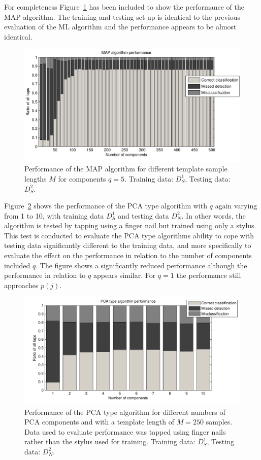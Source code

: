 For completeness Figure~\ref{fig:MAPperformLength} has been included to show the performance of the MAP algorithm. The training and testing set up is identical to the previous evaluation of the ML algorithm and the performance appears to be almost identical.

\begin{figure}[!] %
\centering
\includegraphics[width=150mm]{MAPperformLength.pdf}
\caption{Performance of the MAP algorithm for different template sample lengths $M$ for components $q=5$. Training data: $D^1_S$, Testing data: $D^2_S$.}\label{fig:MAPperformLength}
\end{figure}

Figure~\ref{fig:PCAperformNail} shows the performance of the PCA type algorithm with $q$ again varying from 1 to 10, with training data $D^1_S$ and testing data $D^2_N$. In other words, the algorithm is tested by tapping using a finger nail but trained using only a stylus. This test is conducted to evaluate the PCA type algorithms ability to cope with testing data significantly different to the training data, and more specifically to evaluate the effect on the performance in relation to the number of components included $q$. The figure shows a significantly reduced performance although the performance in relation to $q$ appears similar. For $q=1$ the performance still approaches $p(j)$.

\begin{figure}[!] %
\centering
\includegraphics[width=150mm]{PCAperformNail.pdf}
\caption{Performance of the PCA type algorithm for different numbers of PCA components and with a template length of $M=250$ samples. Data used to evaluate performance was tapped using finger nails rather than the stylus used for training. Training data: $D^1_S$, Testing data: $D^2_N$.}\label{fig:PCAperformNail}
\end{figure}

